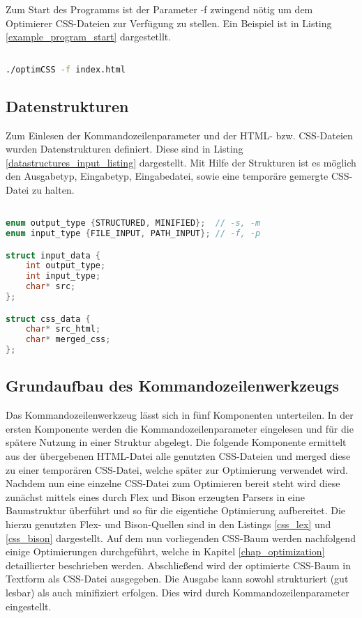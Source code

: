 Zum Start des Programms ist der Parameter -f zwingend nötig um dem Optimierer CSS-Dateien zur Verfügung zu stellen. Ein Beispiel ist in Listing \ref{example_program_start} dargestetllt.

\begin{lstlisting}[label=example_program_start,language=Bash, caption=Programmstart]

./optimCSS -f index.html

\end{lstlisting}

\subsection{Datenstrukturen}

Zum Einlesen der Kommandozeilenparameter und der HTML- bzw. CSS-Dateien wurden Datenstrukturen definiert. Diese sind in Listing \ref{datastructures_input_listing} dargestellt.
Mit Hilfe der Strukturen ist es möglich den Ausgabetyp, Eingabetyp, Eingabedatei, sowie eine temporäre gemergte CSS-Datei zu halten.

\begin{lstlisting}[label=datastructures_input_listing,language=C, caption=Datenstrukturen]

enum output_type {STRUCTURED, MINIFIED};  // -s, -m
enum input_type {FILE_INPUT, PATH_INPUT}; // -f, -p

struct input_data {
	int output_type;
	int input_type;
	char* src;
};

struct css_data {
	char* src_html;
	char* merged_css;
};

\end{lstlisting}


\subsection{Grundaufbau des Kommandozeilenwerkzeugs}
Das Kommandozeilenwerkzeug lässt sich in fünf Komponenten unterteilen. In der ersten Komponente werden die Kommandozeilenparameter eingelesen und für die spätere Nutzung in einer Struktur abgelegt.
Die folgende Komponente ermittelt aus der übergebenen HTML-Datei alle genutzten CSS-Dateien und merged diese zu einer temporären CSS-Datei, welche später zur Optimierung verwendet wird.
Nachdem nun eine einzelne CSS-Datei zum Optimieren bereit steht wird diese zunächst mittels eines durch Flex und Bison erzeugten Parsers in eine Baumstruktur überführt und so für die eigentiche Optimierung aufbereitet.
Die hierzu genutzten Flex- und Bison-Quellen sind in den Listings \ref{css_lex} und \ref{css_bison} dargestellt. 
Auf dem nun vorliegenden CSS-Baum werden nachfolgend einige Optimierungen durchgeführt, welche in Kapitel \ref{chap_optimization} detaillierter beschrieben werden.
Abschließend wird der optimierte CSS-Baum in Textform als CSS-Datei ausgegeben. Die Ausgabe kann sowohl strukturiert (gut lesbar) als auch minifiziert erfolgen. Dies wird durch Kommandozeilenparameter eingestellt.



